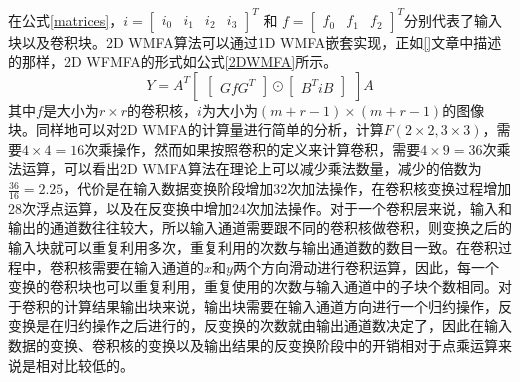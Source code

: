 在公式\ref{matrices}，$i = {\begin{bmatrix}
i_0 & i_1 & i_2 & i_3
\end{bmatrix}}^T$  和 $f = {\begin{bmatrix}
f_0 & f_1 & f_2  
\end{bmatrix}}^T$分别代表了输入块以及卷积块。2D WMFA算法可以通过1D WMFA嵌套实现，正如\ref{}文章中描述的那样，2D WFMFA的形式如公式\ref{2DWMFA}所示。
\begin{equation}
\label{2DWMFA}
Y = A^T\begin{bmatrix}
\begin{bmatrix}
GfG^T
\end{bmatrix} \odot \begin{bmatrix}
B^TiB
\end{bmatrix}
\end{bmatrix}A
\end{equation}  
其中$f$是大小为$r \times r$的卷积核，$i$为大小为$(m+r-1) \times (m+r-1)$的图像块。同样地可以对2D WMFA的计算量进行简单的分析，计算$F(2\times 2,3\times 3)$，需要$4 \times 4 = 16$次乘操作，然而如果按照卷积的定义来计算卷积，需要$4 \times 9 =36$次乘法运算，可以看出2D WMFA算法在理论上可以减少乘法数量，减少的倍数为$\frac{36}{16}=2.25$，代价是在输入数据变换阶段增加32次加法操作，在卷积核变换过程增加28次浮点运算，以及在反变换中增加24次加法操作。对于一个卷积层来说，输入和输出的通道数往往较大，所以输入通道需要跟不同的卷积核做卷积，则变换之后的输入块就可以重复利用多次，重复利用的次数与输出通道数的数目一致。在卷积过程中，卷积核需要在输入通道的$x$和$y$两个方向滑动进行卷积运算，因此，每一个变换的卷积块也可以重复利用，重复使用的次数与输入通道中的子块个数相同。对于卷积的计算结果输出块来说，输出块需要在输入通道方向进行一个归约操作，反变换是在归约操作之后进行的，反变换的次数就由输出通道数决定了，因此在输入数据的变换、卷积核的变换以及输出结果的反变换阶段中的开销相对于点乘运算来说是相对比较低的。

